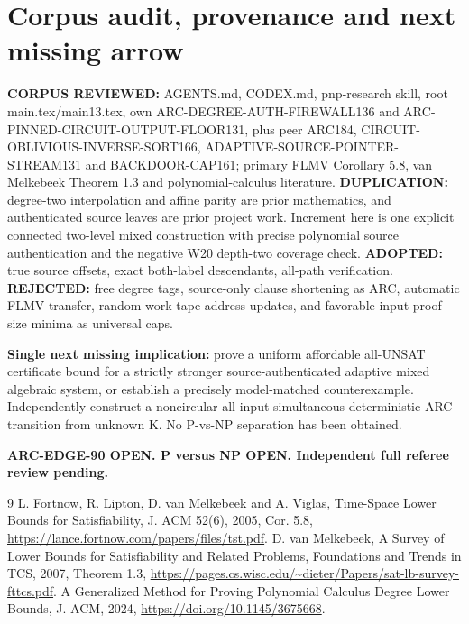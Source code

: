 \documentclass[11pt]{article}
\begin{document}
\section{Corpus audit, provenance and next missing arrow}
\textbf{CORPUS REVIEWED:} AGENTS.md, CODEX.md, pnp-research skill, root main.tex/main13.tex, own ARC-DEGREE-AUTH-FIREWALL136 and ARC-PINNED-CIRCUIT-OUTPUT-FLOOR131, plus peer ARC184, CIRCUIT-OBLIVIOUS-INVERSE-SORT166, ADAPTIVE-SOURCE-POINTER-STREAM131 and BACKDOOR-CAP161; primary FLMV Corollary 5.8, van Melkebeek Theorem 1.3 and polynomial-calculus literature. \textbf{DUPLICATION:} degree-two interpolation and affine parity are prior mathematics, and authenticated source leaves are prior project work. Increment here is one explicit connected two-level mixed construction with precise polynomial source authentication and the negative W20 depth-two coverage check. \textbf{ADOPTED:} true source offsets, exact both-label descendants, all-path verification. \textbf{REJECTED:} free degree tags, source-only clause shortening as ARC, automatic FLMV transfer, random work-tape address updates, and favorable-input proof-size minima as universal caps.

\textbf{Single next missing implication:} prove a uniform affordable all-UNSAT certificate bound for a strictly stronger source-authenticated adaptive mixed algebraic system, or establish a precisely model-matched counterexample. Independently construct a noncircular all-input simultaneous deterministic ARC transition from unknown K. No P-vs-NP separation has been obtained.

\noindent\textbf{ARC-EDGE-90 OPEN. P versus NP OPEN. Independent full referee review pending.}
\begin{thebibliography}{9}
 L. Fortnow, R. Lipton, D. van Melkebeek and A. Viglas, Time-Space Lower Bounds for Satisfiability, J. ACM 52(6), 2005, Cor. 5.8, \url{https://lance.fortnow.com/papers/files/tst.pdf}.
 D. van Melkebeek, A Survey of Lower Bounds for Satisfiability and Related Problems, Foundations and Trends in TCS, 2007, Theorem 1.3, \url{https://pages.cs.wisc.edu/~dieter/Papers/sat-lb-survey-fttcs.pdf}.
 A Generalized Method for Proving Polynomial Calculus Degree Lower Bounds, J. ACM, 2024, \url{https://doi.org/10.1145/3675668}.
\end{thebibliography}
\end{document}
